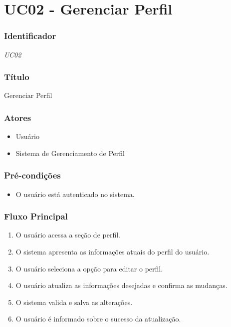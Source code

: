 \chapter{UC02 - Gerenciar Perfil}
\label{apendiceUC02}

\subsection*{Identificador}
\textit{UC02}

\subsection*{Título}
Gerenciar Perfil

\subsection*{Atores}
\begin{addmargin}[1.5cm]{0cm}
    \begin{itemize}
        \item Usuário
        \item Sistema de Gerenciamento de Perfil
    \end{itemize}
\end{addmargin}

\subsection*{Pré-condições}
\begin{addmargin}[1.5cm]{0cm}
    \begin{itemize}
        \item O usuário está autenticado no sistema.
    \end{itemize}
\end{addmargin}

\subsection*{Fluxo Principal}
\begin{addmargin}[1.5cm]{0cm}
    \begin{enumerate}
        \item O usuário acessa a seção de perfil.
        \item O sistema apresenta as informações atuais do perfil do usuário.
        \item O usuário seleciona a opção para editar o perfil.
        \item O usuário atualiza as informações desejadas e confirma as mudanças.
        \item O sistema valida e salva as alterações.
        \item O usuário é informado sobre o sucesso da atualização.
    \end{enumerate}
\end{addmargin}


